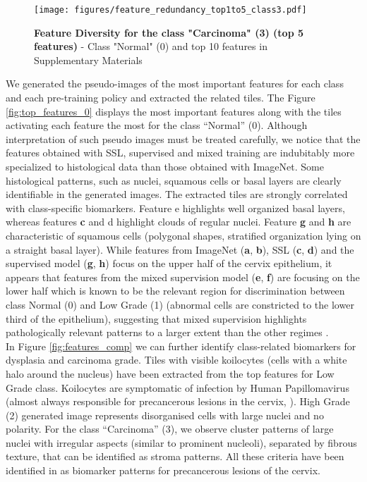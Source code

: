 \begin{figure*}[!t]
\centering
\texttt{[image: figures/feature\_redundancy\_top1to5\_class3.pdf]}
\caption{\textbf{Feature Diversity for the class "Carcinoma" (3) (top 5 features)} - Class "Normal" (0) and top 10 features in Supplementary Materials}
\label{fig:features_diversity}
\end{figure*}


We generated the pseudo-images of the most important features for each class and each pre-training policy and extracted the related tiles. The Figure \ref{fig:top_features_0} displays the most important features along with the tiles activating each feature the most for the class “Normal” (0). Although interpretation of such pseudo images must be treated carefully, we notice that the features obtained with SSL, supervised and mixed training are indubitably more specialized to histological data than those obtained with ImageNet. Some histological patterns, such as nuclei, squamous cells or basal layers are clearly identifiable in the generated images. The extracted tiles are strongly correlated with class-specific biomarkers. Feature e highlights well organized basal layers, whereas features \textbf{c} and d highlight clouds of regular nuclei. Feature \textbf{g} and \textbf{h} are characteristic of squamous cells (polygonal shapes, stratified organization lying on a straight basal layer). While features from ImageNet (\textbf{a}, \textbf{b}), SSL (\textbf{c}, \textbf{d})  and the supervised model (\textbf{g}, \textbf{h}) focus on the upper half of the cervix epithelium, it appears that features from the mixed supervision model (\textbf{e}, \textbf{f}) are focusing on the lower half which is known to be the relevant region for discrimination  between class Normal (0) and Low Grade (1) (abnormal cells are constricted to the lower third of the epithelium), suggesting that mixed supervision highlights pathologically relevant patterns to a larger extent than the other regimes \citep{who_colposcopy_2020}. \\
In Figure \ref{fig:features_comp} we can further identify class-related biomarkers for dysplasia and carcinoma grade. Tiles with visible koilocytes (cells with a white halo around the nucleus) have been extracted from the top features for Low Grade class. Koilocytes are symptomatic of infection by Human Papillomavirus  (almost always responsible for precancerous lesions in the cervix,  \citep{who_colposcopy_2020}). High Grade (2) generated image represents disorganised cells with large nuclei and no polarity. For the class “Carcinoma” (3), we observe cluster patterns of large nuclei with irregular aspects (similar to prominent nucleoli), separated by fibrous texture, that can be identified as stroma patterns. All these criteria have been identified in \citep{who_colposcopy_2020} as biomarker patterns for precancerous lesions of the cervix. \\
